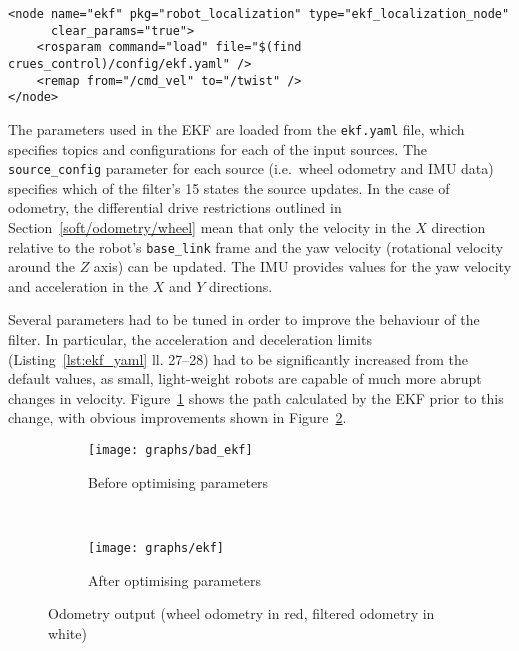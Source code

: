\begin{lstlisting}[caption={EKF node in ROS launch file}, label={lst:ekf_launch}, style=xml]
<node name="ekf" pkg="robot_localization" type="ekf_localization_node"
      clear_params="true">
    <rosparam command="load" file="$(find crues_control)/config/ekf.yaml" />
    <remap from="/cmd_vel" to="/twist" />
</node>
\end{lstlisting}

The parameters used in the EKF are loaded from the \verb|ekf.yaml| file, which
specifies topics and configurations for each of the input sources. The
\verb|source_config| parameter for each source (i.e.\ wheel odometry and IMU data)
specifies which of the filter's 15 states the source updates. In the case of
odometry, the differential drive restrictions outlined in
Section~\ref{soft/odometry/wheel} mean that only the velocity in the $X$
direction relative to the robot's \verb|base_link| frame
and the yaw velocity (rotational velocity around the $Z$ axis) can be updated.
The IMU provides values for the yaw velocity and acceleration in the $X$ and
$Y$ directions.

Several parameters had to be tuned in order to improve the behaviour of the
filter. In particular, the acceleration and deceleration limits
(Listing~\ref{lst:ekf_yaml} ll. 27--28) had to be significantly increased
from the default values, as small, light-weight robots are capable of much more
abrupt changes in velocity. Figure~\ref{fig:ekf_output/bad} shows the path
calculated by the EKF prior to this change, with obvious improvements shown
in Figure~\ref{fig:ekf_output/good}.

\begin{figure}[!ht]
  \centering
  \begin{subfigure}[b]{0.4\textwidth}
    \texttt{[image: graphs/bad\_ekf]}
    \caption{Before optimising parameters}
    \label{fig:ekf_output/bad}
  \end{subfigure}
  ~
  \begin{subfigure}[b]{0.4\textwidth}
    \texttt{[image: graphs/ekf]}
    \caption{After optimising parameters}
    \label{fig:ekf_output/good}
  \end{subfigure}
  \caption[Odometry output]{Odometry output (wheel odometry in red, filtered odometry in white)}\label{fig:ekf_output}
\end{figure}



